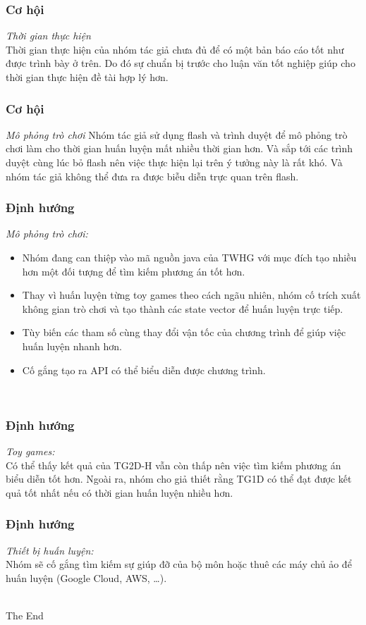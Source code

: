 \documentclass{beamer}
\begin{document}
\begin{frame}
\frametitle{Cơ hội}
\textit{Thời gian thực hiện}\\
Thời gian thực hiện của nhóm tác giả chưa đủ để có một bản báo cáo tốt như được trình bày ở trên. Do đó sự chuẩn bị trước cho luận văn tốt nghiệp giúp cho thời gian thực hiện đề tài hợp lý hơn.
\end{frame}

\begin{frame}
\frametitle{Cơ hội}
\textit{Mô phỏng trò chơi}
Nhóm tác giả sử dụng flash và trình duyệt để mô phỏng trò chơi làm cho thời gian huấn luyện mất nhiều thời gian hơn. Và sắp tới các trình duyệt cùng lúc bỏ flash nên việc thực hiện lại trên ý tưởng này là rất khó. Và nhóm tác giả không thể đưa ra được biễu diễn trực quan trên flash.\\
\end{frame}

\begin{frame}
\frametitle{Định hướng}
\textit{Mô phỏng trò chơi:} 
\begin{itemize}
    \item Nhóm đang can thiệp vào mã nguồn java của TWHG với mục đích tạo nhiều hơn một đối tượng để tìm kiếm phương án tốt hơn.
    \item Thay vì huấn luyện từng toy games theo cách ngãu nhiên, nhóm cố trích xuất không gian trò chơi và tạo thành các state vector để huấn luyện trực tiếp.
    \item Tùy biến các tham số cùng thay đổi vận tốc của chương trình để giúp việc huấn luyện nhanh hơn.
    \item Cố gắng tạo ra API có thể biểu diễn được chương trình.
\end{itemize} \\
\end{frame}

\begin{frame}
\frametitle{Định hướng}
\textit{Toy games:} \\
Có thể thấy kết quả của TG2D-H vẫn còn thấp nên việc tìm kiếm phương án biểu diễn tốt hơn. Ngoài ra, nhóm cho giả thiết rằng TG1D có thể đạt được kết quả tốt nhất nếu có thời gian huấn luyện nhiều hơn.\\
\end{frame}

\begin{frame}
\frametitle{Định hướng}
\textit{Thiết bị huấn luyện:}\\ Nhóm sẽ cố gắng tìm kiếm sự giúp đỡ của bộ môn hoặc thuê các máy chủ ảo để huấn luyện (Google Cloud, AWS, \dots).\\
\\
\end{frame}



\begin{frame}
\Huge{\centerline{The End}}
\end{frame}

\end{document}
